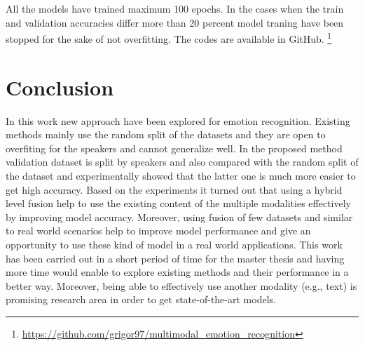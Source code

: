 \documentclass[oneside]{report}
\begin{document}
    
    All the models have trained maximum 100 epochs. In the cases when the train and validation accuracies differ more than 20 percent model traning have been stopped for the sake of not overfitting. The codes are available in GitHub. \footnote{\url{https://github.com/grigor97/multimodal_emotion_recognition}}
    

\chapter{Conclusion}
    In this work new approach have been explored for emotion recognition. Existing methods mainly use the random split of the datasets and they are open to overfiting for the speakers and cannot generalize well. In the proposed method validation dataset is split by speakers and also compared with the random split of the dataset and experimentally showed that the latter one is much more easier to get high accuracy. Based on the experiments it turned out that using a hybrid level fusion help to use the existing content of the multiple modalities effectively by improving model accuracy. Moreover, using fusion of few datasets and similar to real world scenarios help to improve model performance and give an opportunity to use these kind of model in a real world applications. This work has been carried out in a short period of time for the master thesis and having more time would enable to explore existing methods and their performance in a better way. Moreover, being able to effectively use another modality (e.g., text) is promising research area in order to get state-of-the-art models.




\renewcommand{\bibname}{Bibliography}


\end{document}
